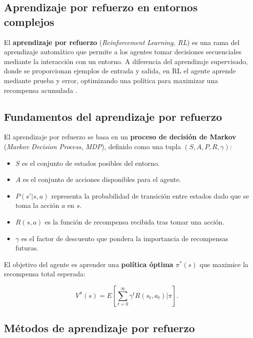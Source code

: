 \begin{itemize}
		\section{Aprendizaje por refuerzo en entornos complejos}
		
		El \textbf{aprendizaje por refuerzo} (\textit{Reinforcement Learning, RL}) es una rama del aprendizaje automático que permite a los agentes tomar decisiones secuenciales mediante la interacción con un entorno. A diferencia del aprendizaje supervisado, donde se proporcionan ejemplos de entrada y salida, en RL el agente aprende mediante prueba y error, optimizando una política para maximizar una recompensa acumulada \cite{sutton2018reinforcement}.
		
		\subsection{Fundamentos del aprendizaje por refuerzo}
		
		El aprendizaje por refuerzo se basa en un \textbf{proceso de decisión de Markov} (\textit{Markov Decision Process, MDP}), definido como una tupla \( (S, A, P, R, \gamma) \):
		
		\begin{itemize}
			\item \( S \) es el conjunto de estados posibles del entorno.
			\item \( A \) es el conjunto de acciones disponibles para el agente.
			\item \( P(s' | s, a) \) representa la probabilidad de transición entre estados dado que se toma la acción \( a \) en \( s \).
			\item \( R(s, a) \) es la función de recompensa recibida tras tomar una acción.
			\item \( \gamma \) es el factor de descuento que pondera la importancia de recompensas futuras.
		\end{itemize}
		
		El objetivo del agente es aprender una \textbf{política óptima} \( \pi^*(s) \) que maximice la recompensa total esperada:
		
		\begin{equation}
			V^\pi(s) = E\left[ \sum_{t=0}^{\infty} \gamma^t R(s_t, a_t) | \pi \right].
		\end{equation}
		
		\subsection{Métodos de aprendizaje por refuerzo}
		

\end{itemize}
